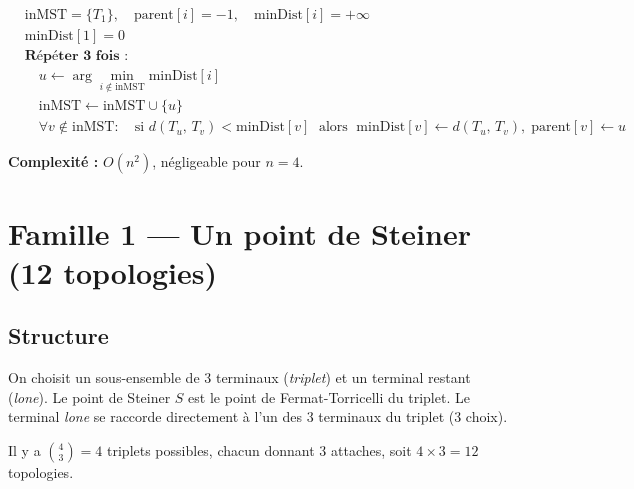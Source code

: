 \documentclass[12pt, a4paper]{article}
\newcommand{\dist}[2]{d\!\left(#1,\,#2\right)}
\begin{document}
\begin{align}
&\text{inMST} = \{T_1\},\quad \text{parent}[i] = -1,\quad \text{minDist}[i] = +\infty \\
&\text{minDist}[1] = 0 \nonumber\\[4pt]
&\textbf{Répéter 3 fois :} \nonumber\\
&\quad u \leftarrow \arg\min_{i \notin \text{inMST}} \text{minDist}[i] \nonumber\\
&\quad \text{inMST} \leftarrow \text{inMST} \cup \{u\} \nonumber\\
&\quad \forall v \notin \text{inMST} :
       \quad \text{si } \dist{T_u}{T_v} < \text{minDist}[v]
       \;\text{ alors }\; \text{minDist}[v] \leftarrow \dist{T_u}{T_v},\;
       \text{parent}[v] \leftarrow u \nonumber
\end{align}

\textbf{Complexité :} $O(n^2)$, négligeable pour $n = 4$.

\section{Famille 1 — Un point de Steiner (12 topologies)}

\subsection{Structure}

On choisit un sous-ensemble de 3 terminaux (\emph{triplet}) et un terminal restant
(\emph{lone}). Le point de Steiner $S$ est le point de Fermat-Torricelli du triplet.
Le terminal \emph{lone} se raccorde directement à l'un des 3 terminaux du triplet
(3 choix).

\medskip

Il y a $\binom{4}{3} = 4$ triplets possibles, chacun donnant 3 attaches, soit
$4 \times 3 = 12$ topologies.

\begin{center}
\end{center}
\end{document}
